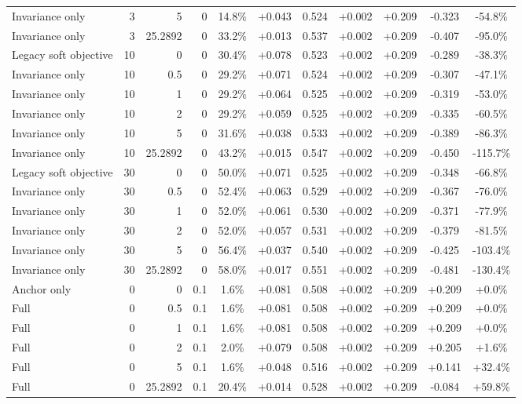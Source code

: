 \begin{table}[htbp]
\begin{tabular}{lrrrccccccc}
Invariance only & 3 & 5 & 0 & 14.8\% & +0.043 & 0.524 & +0.002 & +0.209 & -0.323 & -54.8\% \\
Invariance only & 3 & 25.2892 & 0 & 33.2\% & +0.013 & 0.537 & +0.002 & +0.209 & -0.407 & -95.0\% \\
Legacy soft objective & 10 & 0 & 0 & 30.4\% & +0.078 & 0.523 & +0.002 & +0.209 & -0.289 & -38.3\% \\
Invariance only & 10 & 0.5 & 0 & 29.2\% & +0.071 & 0.524 & +0.002 & +0.209 & -0.307 & -47.1\% \\
Invariance only & 10 & 1 & 0 & 29.2\% & +0.064 & 0.525 & +0.002 & +0.209 & -0.319 & -53.0\% \\
Invariance only & 10 & 2 & 0 & 29.2\% & +0.059 & 0.525 & +0.002 & +0.209 & -0.335 & -60.5\% \\
Invariance only & 10 & 5 & 0 & 31.6\% & +0.038 & 0.533 & +0.002 & +0.209 & -0.389 & -86.3\% \\
Invariance only & 10 & 25.2892 & 0 & 43.2\% & +0.015 & 0.547 & +0.002 & +0.209 & -0.450 & -115.7\% \\
Legacy soft objective & 30 & 0 & 0 & 50.0\% & +0.071 & 0.525 & +0.002 & +0.209 & -0.348 & -66.8\% \\
Invariance only & 30 & 0.5 & 0 & 52.4\% & +0.063 & 0.529 & +0.002 & +0.209 & -0.367 & -76.0\% \\
Invariance only & 30 & 1 & 0 & 52.0\% & +0.061 & 0.530 & +0.002 & +0.209 & -0.371 & -77.9\% \\
Invariance only & 30 & 2 & 0 & 52.0\% & +0.057 & 0.531 & +0.002 & +0.209 & -0.379 & -81.5\% \\
Invariance only & 30 & 5 & 0 & 56.4\% & +0.037 & 0.540 & +0.002 & +0.209 & -0.425 & -103.4\% \\
Invariance only & 30 & 25.2892 & 0 & 58.0\% & +0.017 & 0.551 & +0.002 & +0.209 & -0.481 & -130.4\% \\
Anchor only & 0 & 0 & 0.1 & 1.6\% & +0.081 & 0.508 & +0.002 & +0.209 & +0.209 & +0.0\% \\
Full & 0 & 0.5 & 0.1 & 1.6\% & +0.081 & 0.508 & +0.002 & +0.209 & +0.209 & +0.0\% \\
Full & 0 & 1 & 0.1 & 1.6\% & +0.081 & 0.508 & +0.002 & +0.209 & +0.209 & +0.0\% \\
Full & 0 & 2 & 0.1 & 2.0\% & +0.079 & 0.508 & +0.002 & +0.209 & +0.205 & +1.6\% \\
Full & 0 & 5 & 0.1 & 1.6\% & +0.048 & 0.516 & +0.002 & +0.209 & +0.141 & +32.4\% \\
Full & 0 & 25.2892 & 0.1 & 20.4\% & +0.014 & 0.528 & +0.002 & +0.209 & -0.084 & +59.8\% \\

\end{tabular}
\end{table}
